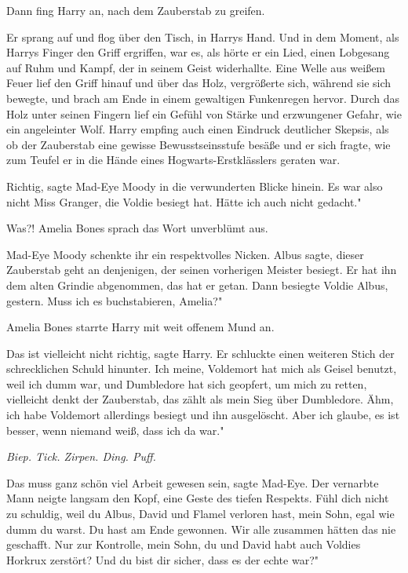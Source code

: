 Dann fing Harry an, nach dem Zauberstab zu greifen.

Er sprang auf und flog über den Tisch, in Harrys Hand. Und in dem Moment, als
Harrys Finger den Griff ergriffen, war es, als hörte er ein Lied, einen
Lobgesang auf Ruhm und Kampf, der in seinem Geist widerhallte. Eine Welle aus
weißem Feuer lief den Griff hinauf und über das Holz, vergrößerte sich, während
sie sich bewegte, und brach am Ende in einem gewaltigen Funkenregen hervor.
Durch das Holz unter seinen Fingern lief ein Gefühl von Stärke und erzwungener
Gefahr, wie ein angeleinter Wolf. Harry empfing auch einen Eindruck deutlicher
Skepsis, als ob der Zauberstab eine gewisse Bewusstseinsstufe besäße und er sich
fragte, wie zum Teufel er in die Hände eines Hogwarts-Erstklässlers geraten war.

\glqq{}Richtig\grqq{}, sagte Mad-Eye Moody in die verwunderten Blicke hinein.
\glqq{}Es war also nicht Miss Granger, die Voldie besiegt hat. Hätte ich auch
nicht gedacht."

\glqq{}Was?!\grqq{} Amelia Bones sprach das Wort unverblümt aus.

Mad-Eye Moody schenkte ihr ein respektvolles Nicken. \glqq{}Albus sagte, dieser
Zauberstab geht an denjenigen, der seinen vorherigen Meister besiegt. Er hat ihn
dem alten Grindie abgenommen, das hat er getan. Dann besiegte Voldie Albus,
gestern. Muss ich es buchstabieren, Amelia?"

Amelia Bones starrte Harry mit weit offenem Mund an.

\glqq{}Das ist vielleicht nicht richtig\grqq{}, sagte Harry. Er schluckte einen
weiteren Stich der schrecklichen Schuld hinunter. \glqq{}Ich meine, Voldemort hat
mich als Geisel benutzt, weil ich dumm war, und Dumbledore hat sich geopfert, um
mich zu retten, vielleicht denkt der Zauberstab, das zählt als mein Sieg über
Dumbledore. Ähm, ich habe Voldemort allerdings besiegt und ihn ausgelöscht. Aber
ich glaube, es ist besser, wenn niemand weiß, dass ich da war."

\emph{Biep. Tick. Zirpen. Ding. Puff.}

\glqq{}Das muss ganz schön viel Arbeit gewesen sein\grqq{}, sagte Mad-Eye. Der
vernarbte Mann neigte langsam den Kopf, eine Geste des tiefen Respekts. \glqq
Fühl dich nicht zu schuldig, weil du Albus, David und Flamel verloren hast, mein
Sohn, egal wie dumm du warst. Du hast am Ende gewonnen. Wir alle zusammen hätten
das nie geschafft. Nur zur Kontrolle, mein Sohn, du und David habt auch Voldies
Horkrux zerstört? Und du bist dir sicher, dass es der echte war?"

